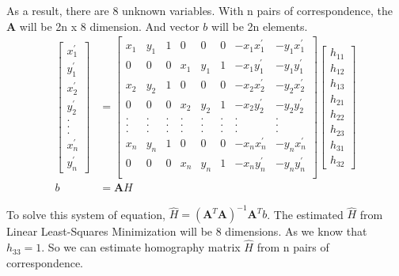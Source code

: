 \documentclass[11pt]{article}
\begin{document}
As a result, there are 8 unknown variables. With n pairs of correspondence, the $\mathbf{A}$ will be 2n x 8 dimension. And vector $b$ will be 2n elements. 
\begin{align*}
\begin{bmatrix}
x_1^{'}\\ y_1^{'}\\ x_2^{'} \\ y_2^{'} \\ . \\  . \\ . \\ x_n^{'} \\ y_n^{'}
\end{bmatrix} &=
\begin{bmatrix}
x_{1} & y_{1} & 1  & 0 & 0 & 0 & -x_{1}x_1^{'} & -y_{1}x_1^{'}\\ 
0 & 0 & 0 & x_{1} & y_{1} & 1 & -x_{1}y_1^{'} & -y_{1}y_1^{'}\\
x_{2} & y_{2} & 1  & 0 & 0 & 0 & -x_{2}x_2^{'} & -y_{2}x_2^{'}\\ 
0 & 0 & 0 & x_{2} & y_{2} & 1 & -x_{2}y_2^{'} & -y_{2}y_2^{'}\\ 
. &  . & . & . & . & . & . & .\\
. &  . & . & . & . & . & . & .\\
. &  . & . & . & . & . & . & .\\
x_{n} & y_{n} & 1  & 0 & 0 & 0 & -x_{n}x_n^{'} & -y_{n}x_n^{'}\\ 
0 & 0 & 0 & x_{n} & y_{n} & 1 & -x_{n}y_n^{'} & -y_{n}y_n^{'}\\ 
\end{bmatrix}
\begin{bmatrix}
h_{11} \\ h_{12}\\ h_{13} \\ h_{21} \\ h_{22} \\ h_{23} \\ h_{31} \\ h_{32}
\end{bmatrix} \\
b &= \mathbf{A}H
\end{align*}

To solve this system of equation, $\hat{H} = (\mathbf{A}^T \mathbf{A})^{-1} \mathbf{A}^T b$. The estimated $\hat{H}$ from Linear Least-Squares Minimization will be 8 dimensions. As we know that $h_{33} = 1$. So we can estimate homography matrix $\hat{H}$ from n pairs of correspondence.
\end{document}
